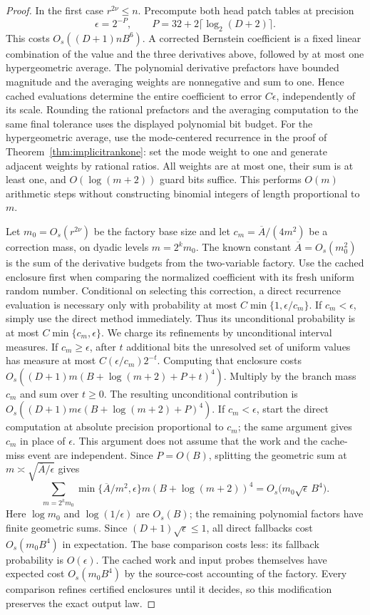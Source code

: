\begin{proof}
In the first case $r^{2\nu}\le n$. Precompute both head
patch tables at precision
\[
 \epsilon=2^{-P},\qquad
 P=32+2\lceil\log_2(D+2)\rceil.
\]
This costs $O_s((D+1)nB^6)$. A corrected Bernstein coefficient
is a fixed linear combination of the value and the three
derivatives above, followed by at most one hypergeometric
average. The polynomial derivative prefactors have bounded
magnitude and the averaging weights are nonnegative and sum
to one. Hence cached evaluations determine the entire
coefficient to error $C\epsilon$, independently of its scale.
Rounding the rational prefactors and the averaging computation
to the same final tolerance uses the displayed polynomial bit
budget. For the hypergeometric average, use the mode-centered
recurrence in the proof of Theorem~\ref{thm:implicitrankone}:
set the mode weight to one and generate adjacent weights by
rational ratios. All weights are at most one, their sum is
at least one, and $O(\log(m+2))$ guard bits suffice.
This performs $O(m)$ arithmetic steps without constructing
binomial integers of length proportional to $m$.

Let $m_0=O_s(r^{2\nu})$ be the factory base size and let
$c_m=\overline A/(4m^2)$ be a correction mass, on dyadic
levels $m=2^km_0$. The known constant
$\overline A=O_s(m_0^2)$ is the sum of the derivative budgets
from the two-variable factory. Use the cached enclosure first
when comparing the normalized coefficient with its fresh
uniform random number. Conditional on selecting this
correction, a direct recurrence evaluation is necessary only
with probability at most $C\min\{1,\epsilon/c_m\}$.
If $c_m<\epsilon$, simply use the direct method immediately.
Thus its unconditional probability is at most
$C\min\{c_m,\epsilon\}$. We charge its refinements by
unconditional interval measures. If $c_m\ge\epsilon$, after
$t$ additional bits the unresolved set of uniform values has
measure at most $C(\epsilon/c_m)2^{-t}$. Computing that
enclosure costs
$O_s((D+1)m(B+\log(m+2)+P+t)^4)$.
Multiply by the branch mass $c_m$ and sum over $t\ge0$.
The resulting unconditional contribution is
$O_s((D+1)m\epsilon(B+\log(m+2)+P)^4)$.
If $c_m<\epsilon$, start the direct computation at absolute
precision proportional to $c_m$; the same argument gives
$c_m$ in place of $\epsilon$. This argument does not assume
that the work and the cache-miss event are independent.
Since $P=O(B)$, splitting the geometric sum at
$m\asymp\sqrt{\overline A/\epsilon}$ gives
\[
 \sum_{m=2^km_0}\min\{\overline A/m^2,\epsilon\}
             m(B+\log(m+2))^4
 =O_s\bigl(m_0\sqrt\epsilon\,B^4\bigr).
\]
Here $\log m_0$ and $\log(1/\epsilon)$ are $O_s(B)$; the
remaining polynomial factors have finite geometric sums.
Since $(D+1)\sqrt\epsilon\le1$, all direct fallbacks cost
$O_s(m_0B^4)$ in expectation. The base comparison costs less:
its fallback probability is $O(\epsilon)$.
The cached work and input probes themselves have expected
cost $O_s(m_0B^4)$ by the source-cost accounting of the factory.
Every comparison refines certified enclosures until it decides,
so this modification preserves the exact output law.


\end{proof}
